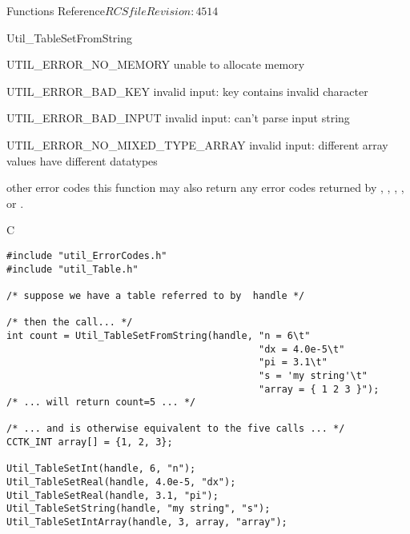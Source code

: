 \begin{cactuspart}{ Functions Reference}{$RCSfile$}{$Revision: 4514 $}
\begin{FunctionDescription}{Util\_TableSetFromString}
\begin{ErrorSection}
\begin{Error}{UTIL\_ERROR\_NO\_MEMORY}
unable to allocate memory
\end{Error}
\begin{Error}{UTIL\_ERROR\_BAD\_KEY}
invalid input: key contains invalid character
\end{Error}
\begin{Error}{UTIL\_ERROR\_BAD\_INPUT}
invalid input: can't parse input string
\end{Error}
\begin{Error}{UTIL\_ERROR\_NO\_MIXED\_TYPE\_ARRAY}
invalid input: different array values have different datatypes
\end{Error}
\begin{Error}{\rm other error codes}
this function may also return any error codes returned by
, ,
, ,
or .
\end{Error}
\end{ErrorSection}

\begin{ExampleSection}
\begin{Example}{C}
\begin{verbatim}
#include "util_ErrorCodes.h"
#include "util_Table.h"

/* suppose we have a table referred to by  handle */

/* then the call... */
int count = Util_TableSetFromString(handle, "n = 6\t"
                                            "dx = 4.0e-5\t"
                                            "pi = 3.1\t"
                                            "s = 'my string'\t"
                                            "array = { 1 2 3 }");
/* ... will return count=5 ... */

/* ... and is otherwise equivalent to the five calls ... */
CCTK_INT array[] = {1, 2, 3};

Util_TableSetInt(handle, 6, "n");
Util_TableSetReal(handle, 4.0e-5, "dx");
Util_TableSetReal(handle, 3.1, "pi");
Util_TableSetString(handle, "my string", "s");
Util_TableSetIntArray(handle, 3, array, "array");
\end{verbatim}
\end{Example}
\end{ExampleSection}
\end{FunctionDescription}



\end{cactuspart}
